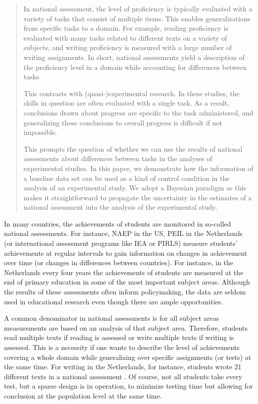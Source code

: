 \documentclass[a4paper]{article}
\newcommand{\DON}	[1] 	{\todo[			linecolor=gray, backgroundcolor=white]	{Don: 	{#1}}}
\newcommand{\DONa}	[1]		{\todo[inline, 	linecolor=gray, backgroundcolor=white]	{Don:	{#1}}}
\newcommand{\DON}	[1] 	{}
\newcommand{\DONa}	[1]		{}
\begin{document}
\begin{abstract}
In national assessment, the level of proficiency is typically evaluated with a variety of tasks that consist of multiple items.
This enables generalizations from specific tasks to a domain.
For example, reading proficiency is evaluated with many tasks related to different texts on a variety of subjects, and writing proficiency is measured with a large number of writing assignments.
In short, national assessments yield a description of the proficiency level in a domain while accounting for differences between tasks.

This contrasts with (quasi-)experimental research.
In these studies, the skills in question are often evaluated with a single task.
As a result, conclusions drawn about progress are specific to the task administered, and generalizing these conclusions to overall progress is difficult if not impossible.

This prompts the question of whether we can use the results of national assessments about differences between tasks in the analyses of experimental studies.
In this paper, we demonstrate how the information of a baseline data set can be used as a kind of control condition in the analysis of an experimental study.
We adopt a Bayesian paradigm as this makes it straightforward to propagate the uncertainty in the estimates of a national assessment into the analysis of the experimental study.
\end{abstract}

In many countries, the achievements of students are monitored in so-called national assessments. For instance, NAEP in the US, PEIL in the Netherlands (or international assessment programs like IEA or PIRLS) measure students' achievements at regular intervals to gain information on changes in achievement over time (or changes in differences between countries). For instance, in the Netherlands every four years the achievements of students are measured at the end of primary education in some of the most important subject areas. Although the results of these assessments often inform policymaking, the data are seldom used in educational research even though there are ample opportunities.

A common denominator in national assessments is for all subject areas measurements are based on an analysis of that subject area. Therefore, students read multiple texts if reading is assessed or write multiple texts if writing is assessed. This is a necessity if one wants to describe the level of achievements covering a whole domain while generalizing over specific assignments (or tests) at the same time. For writing in the Netherlands, for instance, students wrote 21 different texts in a national assessment \cite{zwarts1990balans}. Of course, not all students take every test, but a sparse design is in operation, to minimize testing time but allowing for conclusion at the population level at the same time.
\end{document}
